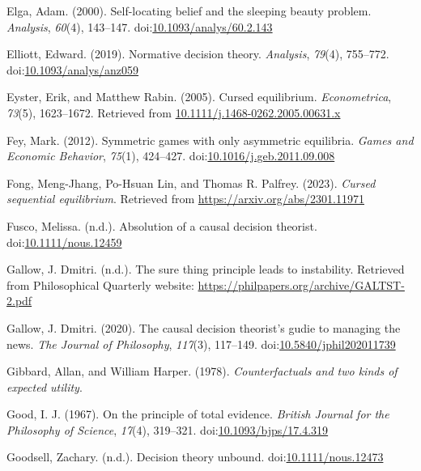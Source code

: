 \documentclass[
  12pt,
  letterpaper,
  DIV=11,
  numbers=noendperiod]{scrreprt}
\newlength{\cslhangindent}
\newenvironment{CSLReferences}[2] %
 {\begin{list}{}{%
  \setlength{\itemindent}{0pt}
  \setlength{\leftmargin}{0pt}
  \setlength{\parsep}{0pt}
  \ifodd #1
   \setlength{\leftmargin}{\cslhangindent}
   \setlength{\itemindent}{-1\cslhangindent}
  \fi
  \setlength{\itemsep}{#2\baselineskip}}}
 {\end{list}}
\begin{document}
\begin{CSLReferences}{1}{0}
Elga, Adam. (2000). Self-locating belief and the sleeping beauty
problem. \emph{Analysis}, \emph{60}(4), 143--147.
doi:\href{https://doi.org/10.1093/analys/60.2.143}{10.1093/analys/60.2.143}

Elliott, Edward. (2019). Normative decision theory. \emph{Analysis},
\emph{79}(4), 755--772.
doi:\href{https://doi.org/10.1093/analys/anz059}{10.1093/analys/anz059}

Eyster, Erik, and Matthew Rabin. (2005). Cursed equilibrium.
\emph{Econometrica}, \emph{73}(5), 1623--1672. Retrieved from
\href{https://10.1111/j.1468-0262.2005.00631.x}{10.1111/j.1468-0262.2005.00631.x}

Fey, Mark. (2012). Symmetric games with only asymmetric equilibria.
\emph{Games and Economic Behavior}, \emph{75}(1), 424--427.
doi:\href{https://doi.org/10.1016/j.geb.2011.09.008}{10.1016/j.geb.2011.09.008}

Fong, Meng-Jhang, Po-Hsuan Lin, and Thomas R. Palfrey. (2023).
\emph{Cursed sequential equilibrium}. Retrieved from
\url{https://arxiv.org/abs/2301.11971}

Fusco, Melissa. (n.d.). Absolution of a causal decision theorist.
doi:\href{https://doi.org/10.1111/nous.12459}{10.1111/nous.12459}

Gallow, J. Dmitri. (n.d.). The sure thing principle leads to
instability. Retrieved from Philosophical Quarterly website:
\url{https://philpapers.org/archive/GALTST-2.pdf}

Gallow, J. Dmitri. (2020). The causal decision theorist's gudie to
managing the news. \emph{The Journal of Philosophy}, \emph{117}(3),
117--149.
doi:\href{https://doi.org/10.5840/jphil202011739}{10.5840/jphil202011739}

Gibbard, Allan, and William Harper. (1978). \emph{Counterfactuals and
two kinds of expected utility}.

Good, I. J. (1967). On the principle of total evidence. \emph{British
Journal for the Philosophy of Science}, \emph{17}(4), 319--321.
doi:\href{https://doi.org/10.1093/bjps/17.4.319}{10.1093/bjps/17.4.319}

Goodsell, Zachary. (n.d.). Decision theory unbound.
doi:\href{https://doi.org/10.1111/nous.12473}{10.1111/nous.12473}


\end{CSLReferences}
\end{document}
